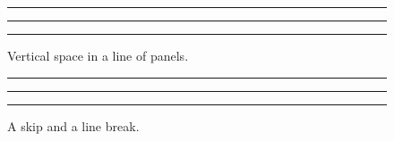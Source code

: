 \documentclass{article}
\begin{document}
\begin{figure}
\centering
\rule{0.3\textwidth}{1cm}\vspace{2mm}
\rule{0.3\textwidth}{1cm}\medskip
\rule{0.3\textwidth}{1cm}
\caption{Vertical space in a line of panels.}
\end{figure}
\begin{figure}
\centering
\rule{0.3\textwidth}{1cm}\vskip 2mm
\rule{0.3\textwidth}{1cm}\linebreak
\rule{0.3\textwidth}{1cm}
\caption{A skip and a line break.}
\end{figure}
\end{document}
